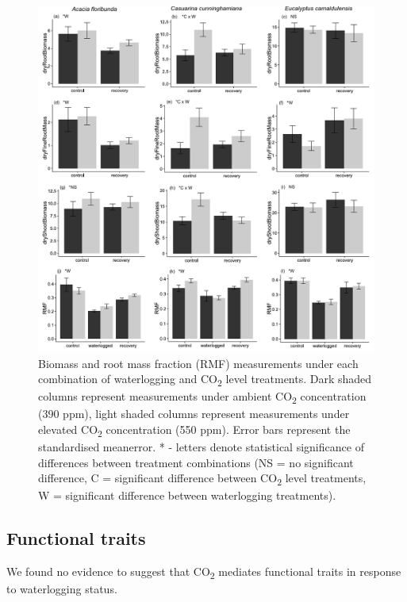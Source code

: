 \documentclass[openright,12pt,a4paper]{memoir}
\begin{document}
\begin{figure}[h!]
\begin{center}
\includegraphics[width=\linewidth, keepaspectratio=true]{biomass.pdf} %
\caption[Biomass and root mass fraction (RMF) measurements under each combination of waterlogging and CO\textsubscript{2} level treatments.]{\small{Biomass and root mass fraction (RMF) measurements under each combination of waterlogging and CO\textsubscript{2} level treatments. Dark shaded columns represent measurements under ambient CO\textsubscript{2} concentration (390 ppm), light shaded columns represent measurements under elevated CO\textsubscript{2} concentration (550 ppm). Error bars represent the standardised meanerror. * - letters denote statistical significance of differences between treatment combinations (NS = no significant difference, C = significant difference between CO\textsubscript{2} level treatments, W = significant difference between waterlogging treatments).}} %
\label{Ch5_F2} %
\end{center}
\end{figure}
\subsection*{Functional traits}
We found no evidence to suggest that CO\textsubscript{2} mediates functional traits in response to waterlogging status.
\end{document}
